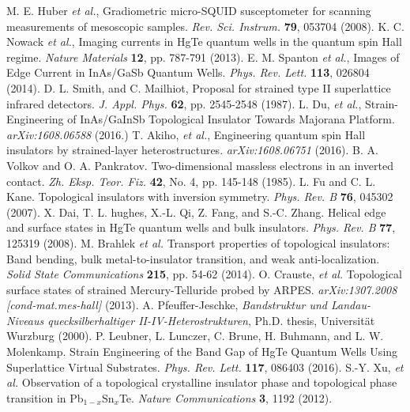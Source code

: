 \documentclass[titlepage,a4paper]{book}
\begin{document}
\begin{thebibliography}{199}
M. E. Huber \textit{et al.}, Gradiometric micro-SQUID susceptometer for scanning measurements of mesoscopic samples. \textit{Rev. Sci. Instrum.} \textbf{79}, 053704 (2008).
K. C. Nowack \textit{et al.}, Imaging currents in HgTe quantum wells in the quantum spin Hall regime. \textit{Nature Materials} \textbf{12}, pp. 787-791 (2013).
E. M. Spanton \textit{et al.}, Images of Edge Current in InAs/GaSb Quantum Wells. \textit{Phys. Rev. Lett.} \textbf{113}, 026804 (2014).
D. L. Smith, and C. Mailhiot, Proposal for strained type II superlattice infrared detectors. \textit{J. Appl. Phys.} \textbf{62}, pp. 2545-2548 (1987). 
L. Du, \textit{et al.}, Strain-Engineering of InAs/GaInSb Topological Insulator Towards Majorana Platform. \textit{arXiv:1608.06588} (2016.)
T. Akiho, \textit{et al.}, Engineering quantum spin Hall insulators by strained-layer heterostructures. \textit{arXiv:1608.06751} (2016).
B. A. Volkov and O. A. Pankratov. Two-dimensional massless electrons in an inverted contact. \textit{Zh. Eksp. Teor. Fiz.} \textbf{42}, No. 4, pp. 145-148 (1985).
L. Fu and C. L. Kane. Topological insulators with inversion symmetry. \textit{Phys. Rev. B} \textbf{76}, 045302 (2007).
X. Dai, T. L. hughes, X.-L. Qi, Z. Fang, and S.-C. Zhang. Helical edge and surface states in HgTe quantum wells and bulk insulators. \textit{Phys. Rev. B} \textbf{77}, 125319 (2008). 
M. Brahlek \textit{et al.} Transport properties of topological insulators: Band bending, bulk metal-to-insulator transition, and weak anti-localization. \textit{Solid State Communications} \textbf{215}, pp. 54-62 (2014).
O. Crauste, \textit{et al.} Topological surface states of strained Mercury-Telluride probed by ARPES. \textit{arXiv:1307.2008 [cond-mat.mes-hall]} (2013).
A. Pfeuffer-Jeschke, \textit{Bandstruktur und Landau-Niveaus quecksilberhaltiger II-IV-Heterostrukturen}, Ph.D. thesis, Universität Wurzburg (2000).
P. Leubner, L. Lunczer, C. Brune, H. Buhmann, and L. W. Molenkamp. Strain Engineering of the Band Gap of HgTe Quantum Wells Using Superlattice Virtual Substrates. \textit{Phys. Rev. Lett.} \textbf{117}, 086403 (2016).
S.-Y. Xu, \textit{et al.} Observation of a topological crystalline insulator phase and topological phase transition in Pb$_{1-x}$Sn$_{x}$Te. \textit{Nature Communications} \textbf{3}, 1192 (2012).

\end{thebibliography}
\end{document}

